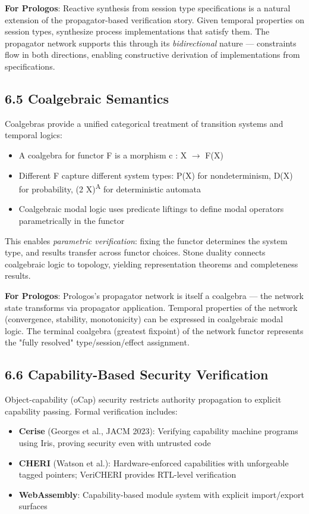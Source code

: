 \documentclass[11pt]{article}
\begin{document}
\textbf{For Prologos}: Reactive synthesis from session type specifications is a
natural extension of the propagator-based verification story. Given temporal
properties on session types, synthesize process implementations that satisfy
them. The propagator network supports this through its \emph{bidirectional} nature
--- constraints flow in both directions, enabling constructive derivation of
implementations from specifications.
\subsection{6.5 Coalgebraic Semantics}
\label{sec:orgd494936}

Coalgebras provide a unified categorical treatment of transition systems and
temporal logics:

\begin{itemize}
\item A coalgebra for functor F is a morphism c : X \(\to\) F(X)
\item Different F capture different system types: P(X) for nondeterminism,
D(X) for probability, (2 \texttimes{} X)\textsuperscript{A} for deterministic automata
\item Coalgebraic modal logic uses predicate liftings to define modal operators
parametrically in the functor
\end{itemize}

This enables \emph{parametric verification}: fixing the functor determines the
system type, and results transfer across functor choices. Stone duality
connects coalgebraic logic to topology, yielding representation theorems
and completeness results.

\textbf{For Prologos}: Prologos's propagator network is itself a coalgebra ---
the network state transforms via propagator application. Temporal properties
of the network (convergence, stability, monotonicity) can be expressed in
coalgebraic modal logic. The terminal coalgebra (greatest fixpoint) of the
network functor represents the "fully resolved" type/session/effect
assignment.
\subsection{6.6 Capability-Based Security Verification}
\label{sec:orgb6c28d9}

Object-capability (oCap) security restricts authority propagation to explicit
capability passing. Formal verification includes:

\begin{itemize}
\item \textbf{Cerise} (Georges et al., JACM 2023): Verifying capability machine programs
using Iris, proving security even with untrusted code
\item \textbf{CHERI} (Watson et al.): Hardware-enforced capabilities with unforgeable
tagged pointers; VeriCHERI provides RTL-level verification
\item \textbf{WebAssembly}: Capability-based module system with explicit import/export
surfaces
\end{itemize}
\end{document}
